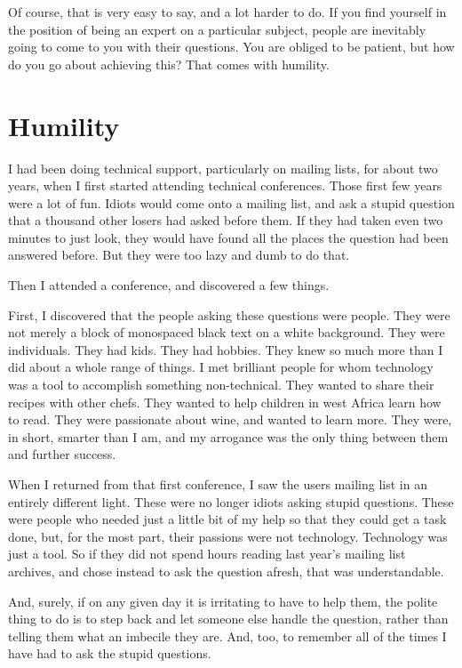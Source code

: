 Of course, that is very easy to say, and a lot harder to do. If you find
yourself in the position of being an expert on a particular subject, people are
inevitably going to come to you with their questions.
You are obliged to be patient, but how do you go about achieving this? That
comes with humility.

\section*{Humility}
I had been doing technical support, particularly on mailing lists, for about two
years, when I first started attending technical conferences. Those first few
years were a lot of fun. Idiots would come onto a mailing list, and ask a stupid
question that a thousand other losers had asked before them. If they had taken
even two minutes to just look, they would have found all the places the question
had been answered before. But they were too lazy and dumb to do that.

Then I attended a conference, and discovered a few things.

First, I discovered that the people asking these questions were people. They
were not merely a block of monospaced black text on a white background. They
were individuals. They had kids. They had hobbies. They knew so much more than I
did about a whole range of things. I met brilliant people for whom
technology was a tool to accomplish something non-technical. They wanted to
share their recipes with other chefs. They wanted to help children in west
Africa learn how to read. They were passionate about wine, and wanted to learn
more. They were, in short, smarter than I am, and my arrogance was the only
thing between them and further success.

When I returned from that first conference, I saw the users mailing list in an
entirely different light. These were no longer idiots asking stupid questions.
These were people who needed just a little bit of my help so that they could get
a task done, but, for the most part, their passions were not technology.
Technology was just a tool. So if they did not spend hours reading last year’s
mailing list archives, and chose instead to ask the question afresh, that was
understandable.

And, surely, if on any given day it is irritating to have to help them, the
polite thing to do is to step back and let someone else handle the question,
rather than telling them what an imbecile they are. And, too, to remember all of
the times I have had to ask the stupid questions.

